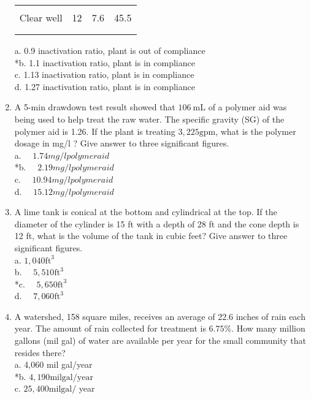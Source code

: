 \begin{enumerate}
\begin{center}
\begin{tabular}{|l|c|c|c|}
\hline\\
Clear well & 12 & 7.6 & 45.5 \\\\
\hline\\
\end{tabular}
\end{center}
a. 0.9 inactivation ratio, plant is out of compliance\\
*b. 1.1 inactivation ratio, plant is in compliance\\
c. 1.13 inactivation ratio, plant is in compliance\\
d. 1.27 inactivation ratio, plant is in compliance\\
\item A 5-min drawdown test result showed that $106 \mathrm{~mL}$ of a polymer aid was being used to help treat the raw water. The specific gravity (SG) of the polymer aid is 1.26. If the plant is treating $3,225 \mathrm{gpm}$, what is the polymer dosage in mg/l ? Give answer to three significant figures.\\
a. $\quad 1.74 mg/l polymer aid$\\
*b. $\quad 2.19 mg/l polymer aid$\\
c. $\quad 10.94 mg/l polymer aid$\\
d. $\quad 15.12 mg/l polymer aid$\\
\item A lime tank is conical at the bottom and cylindrical at the top. If the diameter of the cylinder is 15 ft with a depth of 28 ft and the cone depth is 12 ft, what is the volume of the tank in cubic feet? Give answer to three significant figures.\\
a. $1,040 \mathrm{ft}^{3}$\\
b. $\quad 5,510 \mathrm{ft}^{3}$\\
*c. $\quad 5,650 \mathrm{ft}^{3}$\\
d. $\quad 7,060 \mathrm{ft}^{3}$\\
\item A watershed, 158 square miles, receives an average of 22.6 inches of rain each year. The amount of rain collected for treatment is $6.75 \%$. How many million gallons (mil gal) of water are available per year for the small community that resides there?\\
a. 4,060 mil gal/year\\
*b. $4,190 \mathrm{mil} \mathrm{gal} / \mathrm{year}$\\
c. $25,400 \mathrm{mil} \mathrm{gal} /$ year\\

\end{enumerate}
